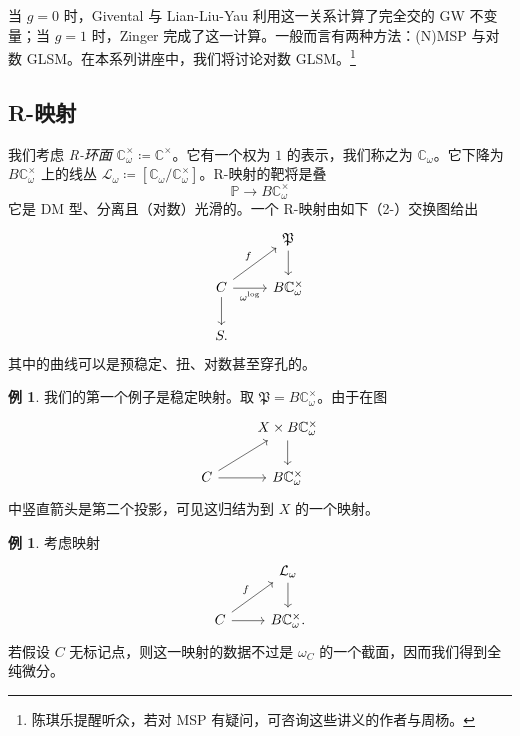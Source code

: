 \documentclass{amsart}
\theoremstyle{definition}
\newtheorem{exm}[thm]{例}
\theoremstyle{remark}
\theoremstyle{plain}
\theoremstyle{definition}
\theoremstyle{remark}
\newcommand{\C}{\mathbb{C}}
\renewcommand{\P}{\mathbb{P}}
\newcommand{\mc}[1]{\mathcal{#1}}
\newcommand{\mf}[1]{\mathfrak{#1}}
\newcommand{\1}{\mathbf{1}}
\newcommand{\2}{\mathbf{2}}
\newcommand{\3}{\mathbf{3}}
\begin{document}
当 \(g = 0\) 时，Givental 与 Lian-Liu-Yau 利用这一关系计算了完全交的 GW 不变量；当 \(g = 1\) 时，Zinger 完成了这一计算。一般而言有两种方法：(N)MSP 与对数 GLSM。在本系列讲座中，我们将讨论对数 GLSM。\footnote{陈琪乐提醒听众，若对 MSP 有疑问，可咨询这些讲义的作者与周杨。}

\subsection{R-映射}%
\label{sub:R-maps}

我们考虑 \textit{R-环面} \(\C^{\times}_{\omega} \coloneqq \C^{\times}\)。它有一个权为 \(1\) 的表示，我们称之为 \(\C_{\omega}\)。它下降为 \(B \C_{\omega}^{\times}\) 上的线丛 \(\mc{L}_{\omega} \coloneqq [\C_{\omega} / \C^{\times}_{\omega}]\)。R-映射的靶将是叠
\[ \P \to B \C^{\times}_{\omega} \]
它是 DM 型、分离且（对数）光滑的。一个 R-映射由如下（2-）交换图给出
\begin{equation*}
\begin{tikzcd}
    & \mf{P} \ar{d} \\
    C \ar{ur}{f} \ar{r}[swap]{\omega^{\log}} \ar{d} & B \C_{\omega}^{\times} \\
    S.
\end{tikzcd}
\end{equation*}
其中的曲线可以是预稳定、扭、对数甚至穿孔的。

\begin{exm}
    我们的第一个例子是稳定映射。取 \(\mf{P} = B\C_{\omega}^{\times}\)。由于在图
    \begin{equation*}
    \begin{tikzcd}
        & X \times B\C_{\omega}^{\times} \ar{d} \\
        C \ar{ur} \ar{r} & B \C_{\omega}^{\times}
    \end{tikzcd}
    \end{equation*}
    中竖直箭头是第二个投影，可见这归结为到 \(X\) 的一个映射。
\end{exm}

\begin{exm}
    考虑映射
    \begin{equation*}
    \begin{tikzcd}
        & \mc{L}_{\omega} \ar{d} \\
        C \ar{ur}{f} \ar{r} & B \C_{\omega}^{\times}.
    \end{tikzcd}
    \end{equation*}
    若假设 \(C\) 无标记点，则这一映射的数据不过是 \(\omega_C\) 的一个截面，因而我们得到全纯微分。
\end{exm}
\end{document}
